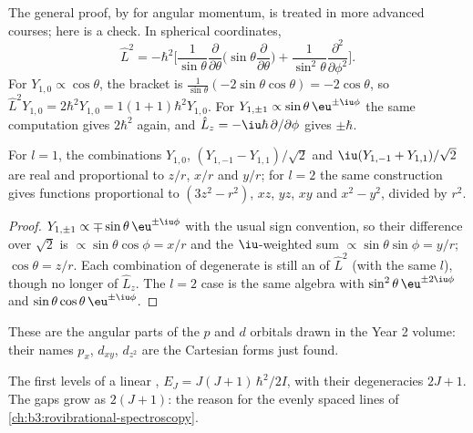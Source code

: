 The general proof, by  for angular momentum, is treated in
more advanced courses; here is a check. In spherical coordinates,
\[
\hat L^2 = -\hbar^2\Big[\frac{1}{\sin\theta}\frac{\partial}{\partial\theta}
\Big(\sin\theta\frac{\partial}{\partial\theta}\Big) +
\frac{1}{\sin^2\theta}\frac{\partial^2}{\partial\phi^2}\Big].
\]
For $Y_{1,0} \propto \cos\theta$, the bracket is $\frac{1}{\sin\theta}(-2\sin\theta
\cos\theta) = -2\cos\theta$, so $\hat L^2Y_{1,0} = 2\hbar^2Y_{1,0} = 1(1+1)\hbar^2
Y_{1,0}$. For $Y_{1,\pm1} \propto \sin\theta\,\eu^{\pm\iu\phi}$ the same
computation gives $2\hbar^2$ again, and $\hat L_z = -\iu\hbar\,\partial/\partial
\phi$ gives $\pm\hbar$.

\begin{proposition}\label{prop:b3:quantum-model-systems:real-harmonics}
For $l = 1$, the combinations $Y_{1,0}$, $(Y_{1,-1} - Y_{1,1})/\sqrt2$ and
$\iu(Y_{1,-1} + Y_{1,1})/\sqrt2$ are real and proportional to $z/r$, $x/r$ and
$y/r$; for $l = 2$ the same construction gives functions proportional to
$(3z^2 - r^2)$, $xz$, $yz$, $xy$ and $x^2 - y^2$, divided by $r^2$.
\end{proposition}

\begin{proof}
$Y_{1,\pm1} \propto \mp\sin\theta\,\eu^{\pm\iu\phi}$ with the usual sign
convention, so their difference over $\sqrt2$ is $\propto\sin\theta\cos\phi =
x/r$ and the $\iu$-weighted sum $\propto\sin\theta\sin\phi = y/r$;
$\cos\theta = z/r$. Each combination of degenerate  is still an
 of $\hat L^2$ (with the same $l$), though no longer of $\hat
L_z$. The $l = 2$ case is the same algebra with $\sin^2\theta\,\eu^{\pm2\iu\phi}$
and $\sin\theta\cos\theta\,\eu^{\pm\iu\phi}$.
\end{proof}

These are the angular parts of the $p$ and $d$ orbitals drawn in the Year
2 volume: their names $p_x$, $d_{xy}$, $d_{z^2}$ are the Cartesian forms just
found.

\begin{omfigure}

{\small The first levels of a linear , $E_J = J(J+1)\,\hbar^2/2I$,
with their degeneracies $2J + 1$. The gaps grow as $2(J+1)$: the reason
for the evenly spaced lines of \cref{ch:b3:rovibrational-spectroscopy}.}
\end{omfigure}

